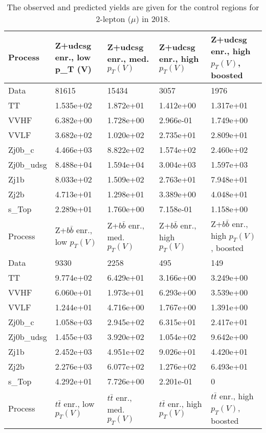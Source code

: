 \begin{table}
\centering
\caption[2018 2-lepton ($\mu$) control region yields]{
                  The observed and predicted yields are given for the
                  control regions for 2-lepton ($\mu$) in 2018.
                  }
{\footnotesize
\begin{tabularx}{\textwidth}{|X|X|X|X|X|}
\hline
Process & Z+udcsg enr., low p_{T} (V) & Z+udcsg enr., med. $p_{T}(V)$ & Z+udcsg enr., high $p_{T}(V)$ & Z+udcsg enr., high $p_{T}(V)$, boosted \\
\hline
Data & 81615 & 15434 & 3057 & 1976 \\
\hline
TT & 1.535e+02 & 1.872e+01 & 1.412e+00 & 1.317e+01 \\
VVHF & 6.382e+00 & 1.728e+00 & 2.966e-01 & 1.749e+00 \\
VVLF & 3.682e+02 & 1.020e+02 & 2.735e+01 & 2.809e+01 \\
Zj0b\_c & 4.466e+03 & 8.822e+02 & 1.574e+02 & 2.460e+02 \\
Zj0b\_udsg & 8.488e+04 & 1.594e+04 & 3.004e+03 & 1.597e+03 \\
Zj1b & 8.033e+02 & 1.509e+02 & 2.763e+01 & 7.948e+01 \\
Zj2b & 4.713e+01 & 1.298e+01 & 3.389e+00 & 4.048e+01 \\
s\_Top & 2.289e+01 & 1.760e+00 & 7.158e-01 & 1.158e+00 \\
\hline
\hline
Process & Z+$b\bar{b}$ enr., low $p_{T}(V)$ & Z+$b\bar{b}$ enr., med. $p_{T}(V)$ & Z+$b\bar{b}$ enr., high $p_{T}(V)$ & Z+$b\bar{b}$ enr., high $p_{T}(V)$, boosted \\
\hline
Data & 9330 & 2258 & 495 & 149 \\
\hline
TT & 9.774e+02 & 6.429e+01 & 3.166e+00 & 3.249e+00 \\
VVHF & 6.060e+01 & 1.973e+01 & 6.293e+00 & 3.539e+00 \\
VVLF & 1.244e+01 & 4.716e+00 & 1.767e+00 & 1.391e+00 \\
Zj0b\_c & 1.058e+03 & 2.945e+02 & 6.315e+01 & 2.417e+01 \\
Zj0b\_udsg & 1.455e+03 & 3.920e+02 & 1.054e+02 & 9.642e+00 \\
Zj1b & 2.452e+03 & 4.951e+02 & 9.026e+01 & 4.420e+01 \\
Zj2b & 2.276e+03 & 6.077e+02 & 1.276e+02 & 6.493e+01 \\
s\_Top & 4.292e+01 & 7.726e+00 & 2.201e-01 & 0 \\
\hline
\hline
Process & $t\bar{t}$ enr., low $p_{T}(V)$ & $t\bar{t}$ enr., med. $p_{T}(V)$ & $t\bar{t}$ enr., high $p_{T}(V)$ & $t\bar{t}$ enr., high $p_{T}(V)$, boosted \\

\end{tabularx}}
\end{table}
